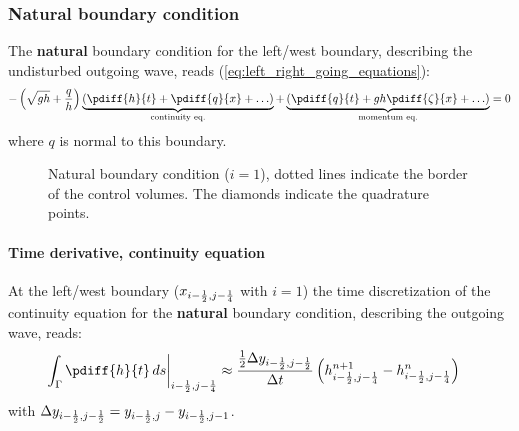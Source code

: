 \subsubsection{Natural boundary condition}
The \textbf{natural} boundary condition for the left/west boundary, describing the undisturbed outgoing wave, reads (\autoref{eq:left_right_going_equations}):
\begin{align}
    - \left(\sqrt{gh} + \frac{q}{h}\right) \underbrace{ \left(\pdiff{h}{t} + \pdiff{q}{x} + \ldots \right) }_{\text{continuity eq.}} + \underbrace{\left(\pdiff{q}{t} + g h \pdiff{\zeta}{x}+\ldots\right)}_{\text{momentum eq.}} = 0
\end{align}
where $q$ is normal to this boundary.
\begin{figure}[H]
    \begin{center}
        \def\svgwidth{0.80\textwidth} %
        \resizebox{0.65\textwidth}{!}{
            
        }
    \end{center}
    \caption{Natural boundary condition ($i=1$), dotted lines indicate the border of the control volumes.
             The diamonds indicate the quadrature points.}
    \label{fig:structured_grid_along_straight_boundary_natural}
\end{figure}
\paragraph*{Time derivative, continuity equation}
At the left/west boundary ($x_{i-\frac{1}{2}, j-\frac{1}{4}}$ with $i=1$) the time discretization of the continuity equation for the \textbf{natural} boundary condition, describing the outgoing wave, reads:
\begin{align}
    \left.\int_\Gamma\pdiff{h}{t}\, ds \right|_{i-\half, j-\quart} & \approx  \frac{\half\Dy_{i-\half, j-\half}}{\Dt}   \left(  h^{n+1}_{i-\half, j-\quart} - h^{n}_{i-\half, j-\quart} \right)
\end{align}
with $\Delta y_{i-\frac{1}{2}, j-\frac{1}{2}} = y_{i-\frac{1}{2}, j} - y_{i-\frac{1}{2}, j-1}$.


